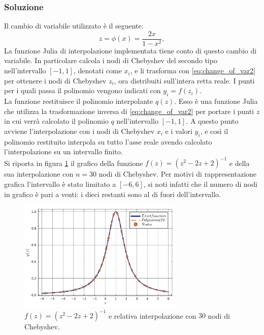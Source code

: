\documentclass[letterpaper, 12pt]{article}
\numberwithin{equation}{section}    %
\begin{document}
\subsubsection{Soluzione}
Il cambio di variabile utilizzato è il seguente: 
\begin{equation}
    \label{eq:change_of_var2}
    z = \phi(x) = \frac{2x}{1 - x^2},
\end{equation}
La funzione Julia di interpolazione implementata tiene conto di questo cambio di variabile. In particolare calcola i nodi 
di Chebyshev del secondo tipo nell'intervallo $[-1, 1]$, denotati come $x_i$, e li trasforma
con \ref{eq:change_of_var2} per ottenere i nodi di Chebyshev $z_i$, ora distribuiti sull'intera retta reale. 
I punti per i quali passa il polinomio vengono indicati con $y_i = f(z_i)$. \\
La funzione restituisce il polinomio interpolante $q(z)$. Esso è una funzione Julia che utilizza la trasformazione inversa
di \ref{eq:change_of_var2} per portare i punti $z$ in cui verrà calcolato il polinomio $q$ nell'intervallo $[-1, 1]$.
A questo punto avviene l'interpolazione con i nodi di Chebyshev $x_i$ e i valori $y_i$, e così il polinomio
restituito interpola su tutto l'asse reale avendo calcolato l'interpolazione su un intervallo finito. \\
Si riporta in figura \ref{fig:es4_4_4_1} il grafico della funzione $f(z)=(z^2-2z+2)^{-1}$ e della sua interpolazione
con $n=30$ nodi di Chebyshev. Per motivi di rappresentazione grafica l'intervallo è stato limitato a $[-6, 6]$, 
si noti infatti che il numero di nodi in grafico è pari a venti: i dieci restanti sono al di fuori dell'intervallo.
\begin{figure}[!ht]
    \centering
    \includegraphics[width=0.7\textwidth]{4441.pdf}
    \caption{$f(z)=(z^2-2z+2)^{-1}$ e relativa interpolazione con $30$ nodi di Chebyshev.}
    \label{fig:es4_4_4_1}
\end{figure}
\end{document}
